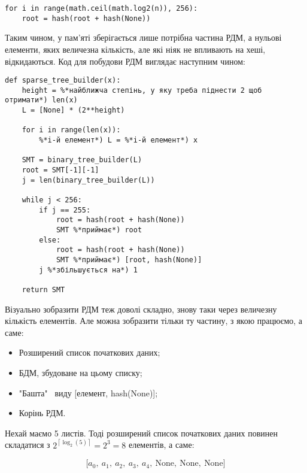 \documentclass[a4paper, 12pt]{article}
\begin{document}
\begin{lstlisting}
for i in range(math.ceil(math.log2(n)), 256):
	root = hash(root + hash(None))
\end{lstlisting}

\par Таким чином, у пам'яті зберігається лише потрібна частина РДМ, а нульові елементи, яких величезна кількість, але які ніяк не впливають на хеші, відкидаються. Код для побудови РДМ виглядає наступним чином:

\begin{lstlisting}
def sparse_tree_builder(x):
    height = %*найближча степінь, у яку треба піднести 2 щоб отримати*) len(x)
    L = [None] * (2**height)
    
    for i in range(len(x)):
        %*i-й елемент*) L = %*i-й елемент*) x
    
    SMT = binary_tree_builder(L)
    root = SMT[-1][-1]
    j = len(binary_tree_builder(L))
    
    while j < 256:
        if j == 255:
            root = hash(root + hash(None))
            SMT %*приймає*) root
        else:
            root = hash(root + hash(None))
            SMT %*приймає*) [root, hash(None)]
        j %*збільшується на*) 1
        
    return SMT
\end{lstlisting}

\par Візуально зобразити РДМ теж доволі складно, знову таки через величезну кількість елементів. Але можна зобразити тільки ту частину, з якою працюємо, а саме:

\begin{itemize}
	\item Розширений список початкових даних;
	\item БДМ, збудоване на цьому списку;
	\item "Башта" \, виду [елемент, hash(None)];
	\item Корінь РДМ.
\end{itemize}

\par Нехай маємо 5 листів. Тоді розширений список початкових даних повинен складатися з $2^{\left\lceil\log_2(5)\right\rceil} = 2^3 = 8$ елементів, а саме:

\[\big[a_0, \ a_1, \ a_2, \ a_3, \ a_4, \ \text{None}, \ \text{None}, \ \text{None}\big]\]
\end{document}
